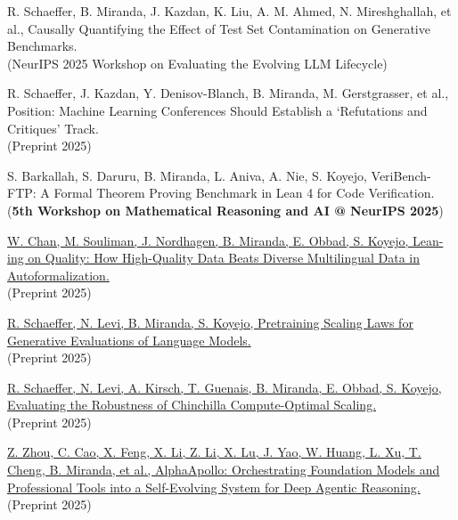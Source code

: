 \documentclass{article}
\newenvironment{changemargin}[2]{%
  \begin{list}{}{%
    \setlength{\topsep}{0pt}%
    \setlength{\leftmargin}{#1}%
    \setlength{\rightmargin}{#2}%
    \setlength{\listparindent}{\parindent}%
    \setlength{\itemindent}{\parindent}%
    \setlength{\parsep}{\parskip}%
  }%
  \item[]}{\end{list}
}
\newenvironment{body} {
	\vspace*{-16pt}
	\begin{changemargin}{-0.25in}{-0.5in}
  }	
	{\end{changemargin}
}
\begin{document}
\begin{body}
    \vspace{10pt}
    {R. Schaeffer, B. Miranda, J. Kazdan, K. Liu, A. M. Ahmed, N. Mireshghallah, et al.,
    Causally Quantifying the Effect of Test Set Contamination on Generative Benchmarks.}
    \\
    (NeurIPS 2025 Workshop on Evaluating the Evolving LLM Lifecycle)

    \vspace{10pt}
    {R. Schaeffer, J. Kazdan, Y. Denisov-Blanch, B. Miranda, M. Gerstgrasser, et al.,
    Position: Machine Learning Conferences Should Establish a `Refutations and Critiques' Track.}
    \\
    (Preprint 2025)

    \vspace{10pt}
    {S. Barkallah, S. Daruru, B. Miranda, L. Aniva, A. Nie, S. Koyejo,
    VeriBench-FTP: A Formal Theorem Proving Benchmark in Lean 4 for Code Verification.}
    \\
    (\textbf{5th Workshop on Mathematical Reasoning and AI @ NeurIPS 2025})

    \vspace{10pt}
    \href{https://arxiv.org/abs/2502.15795}
    {W. Chan, M. Souliman, J. Nordhagen, B. Miranda, E. Obbad, S. Koyejo,
    Lean-ing on Quality: How High-Quality Data Beats Diverse Multilingual Data in Autoformalization.}
    \\
    (Preprint 2025)

    \vspace{10pt}
    \href{https://arxiv.org/abs/2509.24012}
    {R. Schaeffer, N. Levi, B. Miranda, S. Koyejo,
    Pretraining Scaling Laws for Generative Evaluations of Language Models.}
    \\
    (Preprint 2025)

    \vspace{10pt}
    \href{https://arxiv.org/abs/2509.23963}
    {R. Schaeffer, N. Levi, A. Kirsch, T. Guenais, B. Miranda, E. Obbad, S. Koyejo,
    Evaluating the Robustness of Chinchilla Compute-Optimal Scaling.}
    \\
    (Preprint 2025)

    \vspace{10pt}
    \href{https://arxiv.org/abs/2510.06261}
    {Z. Zhou, C. Cao, X. Feng, X. Li, Z. Li, X. Lu, J. Yao, W. Huang, L. Xu, T. Cheng, B. Miranda, et al.,
    AlphaApollo: Orchestrating Foundation Models and Professional Tools into a Self-Evolving System for Deep Agentic Reasoning.}
    \\
    (Preprint 2025)


\end{body}
\end{document}
